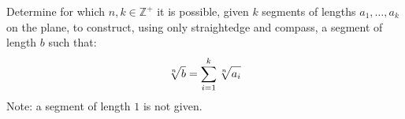 Determine for which $n, k \in \mathbb{Z}^{+}$ it is possible,
given $k$ segments of lengths $a_1, \dotsc, a_k$ on the plane,
to construct, using only straightedge and compass,
a segment of length $b$ such that:
\begin{equation*}
 \sqrt[n]{b \vphantom{a_i}} = \sum\limits_{i = 1}^{k} {\sqrt[n]{a_i \vphantom{b}}}
\end{equation*}
Note: a segment of length $1$ is not given.
